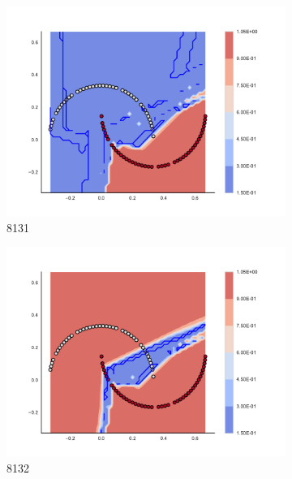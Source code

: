 \begin{figure}[h]
\begin{subfigure}[b]{0.09\textwidth}
    \includegraphics[clip, trim=2.35cm 1.75cm 4.5cm 0cm,width=\textwidth]{img/convergence/8131.pdf}
    \caption{8131}
    \label{fig:convergence_8131}
\end{subfigure}
%
\begin{subfigure}[b]{0.09\textwidth}
    \includegraphics[clip, trim=2.35cm 1.75cm 4.5cm 0cm,width=\textwidth]{img/convergence/8132.pdf}
    \caption{8132}
    \label{fig:convergence_8132}
\end{subfigure}
%
\begin{subfigure}[b]{0.09\textwidth}

\end{subfigure}
\end{figure}
